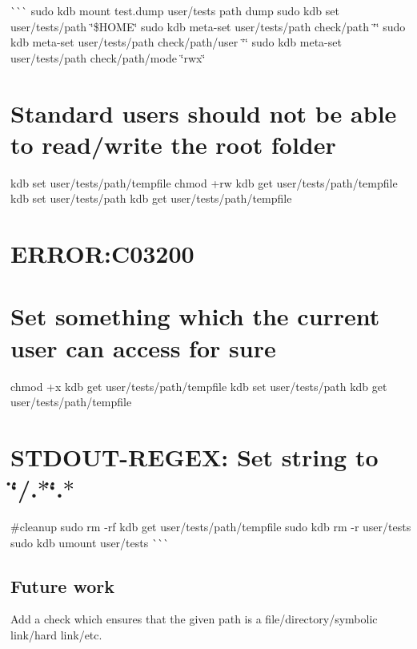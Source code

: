 \`{}\`{}\`{} sudo kdb mount test.\+dump user/tests path dump sudo kdb set user/tests/path \char`\"{}\$\+H\+O\+M\+E\char`\"{} sudo kdb meta-\/set user/tests/path check/path \char`\"{}\char`\"{} sudo kdb meta-\/set user/tests/path check/path/user \char`\"{}\char`\"{} sudo kdb meta-\/set user/tests/path check/path/mode \char`\"{}rwx\char`\"{}\hypertarget{autotoc_md520_autotoc_md524}{}\section{Standard users should not be able to read/write the root folder}\label{autotoc_md520_autotoc_md524}
kdb set user/tests/path/tempfile  chmod +rw {\ttfamily kdb get user/tests/path/tempfile} kdb set user/tests/path {\ttfamily kdb get user/tests/path/tempfile} \hypertarget{autotoc_md520_autotoc_md525}{}\section{E\+R\+R\+O\+R\+:\+C03200}\label{autotoc_md520_autotoc_md525}
\hypertarget{autotoc_md520_autotoc_md526}{}\section{Set something which the current user can access for sure}\label{autotoc_md520_autotoc_md526}
chmod +x {\ttfamily kdb get user/tests/path/tempfile} kdb set user/tests/path {\ttfamily kdb get user/tests/path/tempfile} \hypertarget{autotoc_md520_autotoc_md527}{}\section{S\+T\+D\+O\+U\+T-\/\+R\+E\+G\+E\+X\+: Set string to \char`\"{}/.$\ast$\char`\"{}.$\ast$}\label{autotoc_md520_autotoc_md527}
\#cleanup sudo rm -\/rf {\ttfamily kdb get user/tests/path/tempfile} sudo kdb rm -\/r user/tests sudo kdb umount user/tests \`{}\`{}\`{}\hypertarget{autotoc_md520_autotoc_md528}{}\subsection{Future work}\label{autotoc_md520_autotoc_md528}
Add a check which ensures that the given path is a file/directory/symbolic link/hard link/etc. 